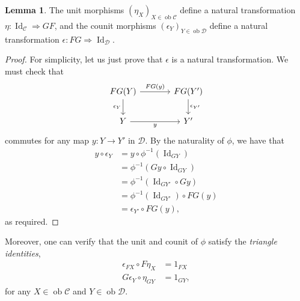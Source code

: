 \documentclass[10pt,letterpaper,cm]{nupset}
\theoremstyle{definition}
\theoremstyle{theorem}
\newtheorem{lemma}[definition]{Lemma}
\theoremstyle{remark}
\newcommand{\1}{\mathbf{1}}
\renewcommand{\c}{\mathscr{C}}
\renewcommand{\d}{\mathscr{D}}
\newcommand{\0}{\vec 0}
\DeclareMathOperator{\id}{Id}
\DeclareMathOperator{\ob}{ob}
\begin{document}
\begin{lemma}
The unit morphisms $\left(\eta_X\right)_{X\in \ob{\c}}$ define a natural transformation $\eta: \id_{\c} \Rightarrow GF$, and the counit morphisms $\left(\epsilon_Y\right)_{Y\in \ob{\d}}$ define a natural transformation $\epsilon: FG \Rightarrow \id_{\d}$.
\end{lemma}
\begin{proof}
For simplicity, let us just prove that $\epsilon$ is a natural transformation. We must check that
\[
\begin{tikzcd}[column sep=large]
FG(Y) \arrow[d, "\epsilon_Y"'] \arrow[r, "FG(y)"] & FG(Y') \arrow[d, "\epsilon_{Y'}"] \\
Y \arrow[r, "y"']                             & Y'                               
\end{tikzcd}
\] commutes for any map $y: Y\to Y'$ in $\d$. By the naturality of $\phi$, we have that
\begin{align*}
y\circ \epsilon_Y  & =  y\circ \phi^{{-1}}\left(\id_{G{Y}}\right)
\\ & = \phi^{{-1}}\left(G{y} \circ \id_{G{Y}}\right)
\\ & =  \phi^{{-1}}\left(\id_{G{Y'}} \circ G{y}\right)
\\ & =   \phi^{{-1}}\left( \id_{G{Y'}}\right) \circ FG(y) 
\\ & = \epsilon_{Y'} \circ FG(y)
,\end{align*} as required.
\end{proof}

Moreover, one can verify that the unit and counit of $\phi$ satisfy the \textit{triangle identities},
\begin{align}
\epsilon_{F{X}} \circ F \eta_{X} &=1_{F{X}} \label{tri1} \tag{$\vartriangle_1$}
\\ G \epsilon_{Y} \circ \eta_{G{Y}} &=1_{G{Y}}, \label{tri2} \tag{$\vartriangle_2$}
\end{align}
for any $X\in \ob{\c}$ and $Y\in \ob{\d}$.

\smallskip
\end{document}
